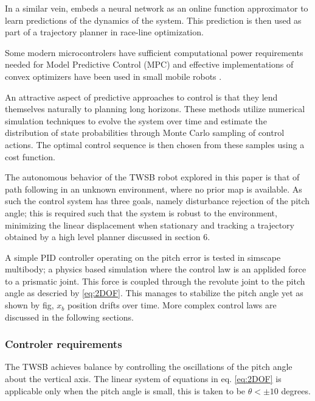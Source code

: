         In a similar vein, \cite{williams2016aggressive} embeds a neural network as an online function approximator to learn 
        predictions of the dynamics of the system. This prediction is then used as part of a trajectory planner in race-line optimization. 
    
        Some modern microcontrolers have sufficient computational power requirements needed for Model Predictive Control (MPC) and 
        effective implementations of convex optimizers \cite{nguyen2024tinympc} have been used in small mobile robots \cite{giernacki2017crazyflie}.
            
        An attractive aspect of predictive approaches to control is that they lend themselves naturally to 
        planning long horizons. These methods utilize numerical simulation techniques to evolve the system over time 
        and estimate the distribution of state probabilities through Monte Carlo sampling of control actions. 
        The optimal control sequence is then chosen from these samples using a cost function.
                
        The autonomous behavior of the TWSB robot explored in this paper is that of path 
        following in an unknown environment, where no prior map is available. As such the 
        control system has three goals, namely disturbance rejection of the pitch angle; 
        this is required such that the system is robust to the environment, minimizing 
        the linear displacement when stationary and tracking a trajectory obtained by a 
        high level planner discussed in section 6. 

        A simple PID controller operating on the pitch error is tested in simscape multibody; 
        a physics based simulation where the control law is an applided force to a prismatic joint. 
        This force is coupled through the revolute joint to the pitch angle as descried by \ref{eq:2DOF}.
        This manages to stabilize the pitch angle yet as shown by fig, $x_b$ position drifts over time.
        More complex control laws are discussed in the following sections.

        \subsubsection{Controler requirements}

        The TWSB achieves balance by controlling the oscillations of the pitch angle about the 
        vertical axis. The linear system of equations in eq. \ref{eq:2DOF} is applicable 
        only when the pitch angle is small, this is taken to be $\theta < ±10$ degrees. 

